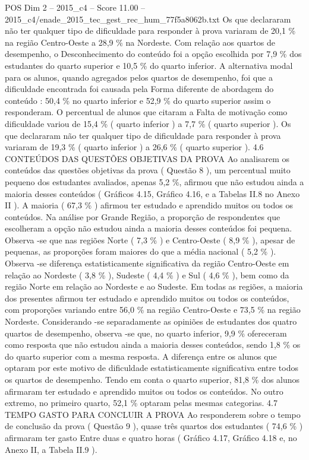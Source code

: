 \begin{textsample}{POS Dim 2 – 2015\_c4 – Score 11.00 – 2015\_c4/enade\_2015\_tec\_gest\_rec\_hum\_77f5a8062b.txt}
Os que declararam não ter qualquer tipo de dificuldade para responder à prova variaram de 20,1 \% na região Centro-Oeste a 28,9 \% na Nordeste.
Com relação aos quartos de desempenho, o Desconhecimento do conteúdo foi a opção escolhida por 7,9 \% dos estudantes do quarto superior e 10,5 \% do quarto inferior.
A alternativa modal para os alunos, quando agregados pelos quartos de desempenho, foi que a dificuldade encontrada foi causada pela Forma diferente de abordagem do conteúdo : 50,4 \% no quarto inferior e 52,9 \% do quarto superior assim o responderam.
O percentual de alunos que citaram a Falta de motivação como dificuldade variou de 15,4 \% ( quarto inferior ) a 7,7 \% ( quarto superior ).
Os que declararam não ter qualquer tipo de dificuldade para responder à prova variaram de 19,3 \% ( quarto inferior ) a 26,6 \% ( quarto superior ). 4.6 CONTEÚDOS DAS QUESTÕES OBJETIVAS DA PROVA Ao analisarem os conteúdos das questões objetivas da prova ( Questão 8 ), um percentual muito pequeno dos estudantes avaliados, apenas 5,2 \%, afirmou que não estudou ainda a maioria desses conteúdos ( Gráficos 4.15, Gráfico 4.16, e a Tabelas II.8 no Anexo II ).
A maioria ( 67,3 \% ) afirmou ter estudado e aprendido muitos ou todos os conteúdos.
Na análise por Grande Região, a proporção de respondentes que escolheram a opção não estudou ainda a maioria desses conteúdos foi pequena.
Observa -se que nas regiões Norte ( 7,3 \% ) e Centro-Oeste ( 8,9 \% ), apesar de pequenas, as proporções foram maiores do que a média nacional ( 5,2 \% ).
Observa -se diferença estatisticamente significativa da região Centro-Oeste em relação ao Nordeste ( 3,8 \% ), Sudeste ( 4,4 \% ) e Sul ( 4,6 \% ), bem como da região Norte em relação ao Nordeste e ao Sudeste.
Em todas as regiões, a maioria dos presentes afirmou ter estudado e aprendido muitos ou todos os conteúdos, com proporções variando entre 56,0 \% na região Centro-Oeste e 73,5 \% na região Nordeste.
Considerando -se separadamente as opiniões de estudantes dos quatro quartos de desempenho, observa -se que, no quarto inferior, 9,9 \% ofereceram como resposta que não estudou ainda a maioria desses conteúdos, sendo 1,8 \% os do quarto superior com a mesma resposta.
A diferença entre os alunos que optaram por este motivo de dificuldade estatisticamente significativa entre todos os quartos de desempenho.
Tendo em conta o quarto superior, 81,8 \% dos alunos afirmaram ter estudado e aprendido muitos ou todos os conteúdos.
No outro extremo, no primeiro quarto, 52,1 \% optaram pelas mesmas categorias. 4.7 TEMPO GASTO PARA CONCLUIR A PROVA Ao responderem sobre o tempo de conclusão da prova ( Questão 9 ), quase três quartos dos estudantes ( 74,6 \% ) afirmaram ter gasto Entre duas e quatro horas ( Gráfico 4.17, Gráfico 4.18 e, no Anexo II, a Tabela II.9 ).

\end{textsample}
